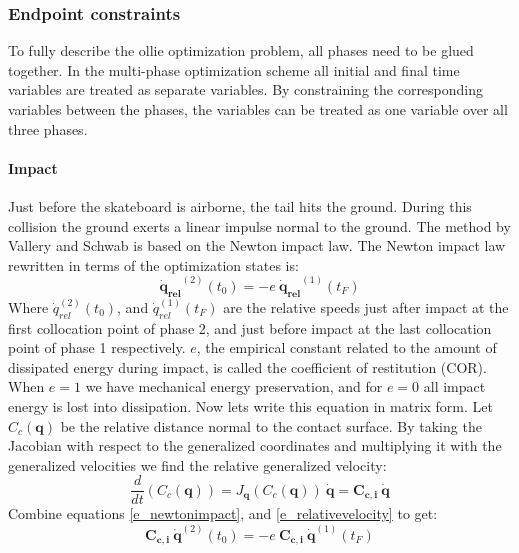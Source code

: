 \subsubsection{Endpoint constraints} \label{p_endpoints}
\noindent To fully describe the ollie optimization problem, all phases need to be glued together. In the multi-phase optimization scheme all initial and final time variables are treated as separate variables. By constraining the corresponding variables between the phases, the variables can be treated as one variable over all three phases.

\paragraph{Impact}
\noindent Just before the skateboard is airborne, the tail hits the ground. During this collision the ground exerts a linear impulse normal to the ground. The method by Vallery and Schwab \cite{vallery_heike_advanced_2018} is based on the Newton impact law. The Newton impact law rewritten in terms of the optimization states is:
\begin{equation}\label{e_newtonimpact}
    \mathbf{\dot q_{rel}}^{(2)}(t_0) = -e\ \mathbf{\dot q_{rel}}^{(1)}(t_F)
\end{equation}
Where $\dot q_{rel}^{(2)}(t_0)$, and $\dot q_{rel}^{(1)}(t_F)$ are the relative speeds just after impact at the first collocation point of phase 2, and just before impact at the last collocation point of phase 1 respectively.  $e$, the empirical constant related to the amount of dissipated energy during impact, is called the coefficient of restitution (COR). When $e=1$ we have mechanical energy preservation, and for $e=0$ all impact energy is lost into dissipation. Now lets write this equation in matrix form. Let $C_c(\mathbf{q})$ be the relative distance normal to the contact surface. By taking the Jacobian with respect to the generalized coordinates and multiplying it with the generalized velocities we find the relative generalized velocity:
\begin{equation}\label{e_relativevelocity}
    \frac{d}{dt}\left(C_c(\mathbf{q})\right) = J_{\mathbf{q}}(C_c(\mathbf{q}))\ \mathbf{\dot q} = \mathbf{C_{c,i}}\  \mathbf{\dot q}
\end{equation}
Combine equations \ref{e_newtonimpact}, and \ref{e_relativevelocity} to get:
\begin{equation}
    \mathbf{C_{c,i}}\  \mathbf{\dot q}^{(2)}(t_0) = -e\ \mathbf{C_{c,i}}\ \mathbf{\dot q}^{(1)}(t_F)
\end{equation}
